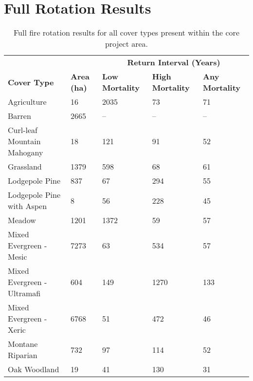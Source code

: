 \restoregeometry
\pagestyle{headings}

\section{Full Rotation Results}
\label{sec:full-rot-results}

\begin{table}[!htbp]
\caption{Full fire rotation results for all cover types present within the core project area.}
\small
\begin{tabular}{@{}lllll@{}}
\toprule
	& 		&		\multicolumn{3}{c}{\textbf{Return Interval (Years)}} \\
\textbf{Cover Type}                                                                     & \textbf{Area (ha)} & \textbf{Low Mortality} & \textbf{High Mortality} & \textbf{Any Mortality} \\ \midrule
Agriculture     				& 16   		& 2035   	& 73     	& 71     \\
Barren    						& 2665   	& --      	& --   		& --  \\
Curl-leaf Mountain Mahogany  	& 18   		& 121    	& 91     	& 52    \\
Grassland     					& 1379  	& 598     	& 68     	& 61   \\
Lodgepole Pine   				& 837   	& 67     	& 294      	& 55      \\
Lodgepole Pine with Aspen       & 8     	& 56       	& 228 		& 45                                 \\
Meadow     						& 1201      & 1372     	& 59  		& 57                                 \\
Mixed Evergreen - Mesic         & 7273      & 63   		& 534    	& 57     \\
Mixed Evergreen - Ultramafi     & 604  		& 149 		& 1270 		& 133   \\
Mixed Evergreen - Xeric         & 6768 		& 51  		& 472  		& 46    \\
Montane Riparian                & 732  		& 97  		& 114  		& 52    \\
Oak Woodland                    & 19   		& 41  		& 130  		& 31            \\

\end{tabular}
\end{table}
